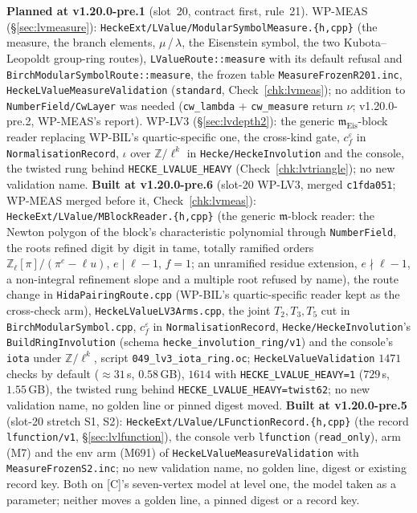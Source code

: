 \documentclass[11pt]{article}
\theoremstyle{remark}
\newcommand{\Z}{\mathbb{Z}}
\newcommand{\m}{\mathfrak{m}}
\begin{document}
\textbf{Planned at v1.20.0-pre.1} (slot~20, contract first, rule~21). WP-MEAS (\S\ref{sec:lvmeasure}): \texttt{HeckeExt/LValue/ModularSymbolMeasure.\{h,cpp\}} (the measure, the branch elements,
$\mu$\,/\,$\lambda$, the Eisenstein symbol, the two Kubota--Leopoldt group-ring routes), \texttt{LValueRoute::measure} with its default refusal and \texttt{BirchModularSymbolRoute::measure},
the frozen table \texttt{MeasureFrozenR201.inc}, \texttt{HeckeLValueMeasureValidation} (\texttt{standard}, Check~\ref{chk:lvmeas}); no addition to
\texttt{NumberField/CwLayer} was needed (\texttt{cw\_lambda} + \texttt{cw\_measure} return $\nu$; v1.20.0-pre.2, WP-MEAS's report). WP-LV3 (\S\ref{sec:lvdepth2}): the generic $\m_{\mathrm{Eis}}$-block reader replacing WP-BIL's quartic-specific one, the cross-kind gate,
$c^{\varepsilon}_f$ in \texttt{NormalisationRecord}, $\iota$ over $\Z/\ell^{k}$ in \texttt{Hecke/HeckeInvolution} and the console, the twisted rung behind \texttt{HECKE\_LVALUE\_HEAVY}
(Check~\ref{chk:lvtriangle}); no new validation name. \textbf{Built at v1.20.0-pre.6} (slot-20 WP-LV3, merged \texttt{c1fda051}; WP-MEAS merged before it, Check~\ref{chk:lvmeas}):
\texttt{HeckeExt/LValue/MBlockReader.\{h,cpp\}} (the generic $\m$-block reader: the Newton polygon of the block's characteristic polynomial through \texttt{NumberField}, the roots refined digit by digit in
tame, totally ramified orders $\Z_\ell[\pi]/(\pi^{e}-\ell u)$, $e\mid\ell-1$, $f=1$; an unramified residue extension, $e\nmid\ell-1$, a non-integral refinement slope and a multiple root refused by name),
the route change in \texttt{HidaPairingRoute.cpp} (WP-BIL's quartic-specific reader kept as the cross-check arm), \texttt{HeckeLValueLV3Arms.cpp}, the joint $T_2,T_3,T_5$ cut in
\texttt{BirchModularSymbol.cpp}, $c^{\varepsilon}_f$ in \texttt{NormalisationRecord}, \texttt{Hecke/HeckeInvolution}'s \texttt{BuildRingInvolution} (schema \texttt{hecke\_involution\_ring/v1}) and the
console's \texttt{iota} under $\Z/\ell^{k}$, script \texttt{049\_lv3\_iota\_ring.oc}; \texttt{HeckeLValueValidation} $1471$ checks by default ($\approx31$\,s, $0.58$\,GB), $1614$ with
\texttt{HECKE\_LVALUE\_HEAVY=1} ($729$\,s, $1.55$\,GB), the twisted rung behind \texttt{HECKE\_LVALUE\_HEAVY=twist62}; no new validation name, no golden line or pinned digest moved.
\textbf{Built at v1.20.0-pre.5} (slot-20 stretch S1, S2): \texttt{HeckeExt/LValue/LFunctionRecord.\{h,cpp\}} (the record
\texttt{lfunction/v1}, \S\ref{sec:lvlfunction}), the console verb \texttt{lfunction} (\texttt{read\_only}), arm (M7) and the env arm (M691) of \texttt{HeckeLValueMeasureValidation} with
\texttt{MeasureFrozenS2.inc}; no new validation name, no golden line, digest or existing record key. Both on [C]'s seven-vertex model at level one, the model taken as a parameter; neither moves a golden line, a pinned digest or a record key.
\end{document}
